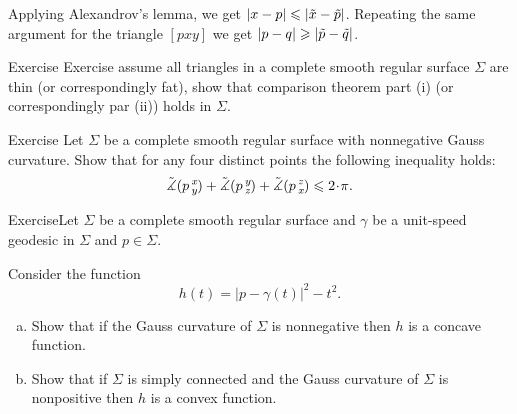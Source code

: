 Applying Alexandrov's lemma, we get $|x-p|\le |\~x-\~p|$.
Repeating the same argument for the triangle $[pxy]$ we get $|p-q|\ge |\~p-\~q|$.\qeds

\begin{thm}{Exercise}
Exercise assume all triangles in a complete smooth regular surface $\Sigma$ are thin (or correspondingly fat), show that comparison theorem part (i) (or correspondingly par (ii)) holds in $\Sigma$.
\end{thm}

\begin{thm}{Exercise}
Let $\Sigma$ be a complete smooth regular surface with nonnegative Gauss curvature.
Show that for any four distinct points the following inequality holds:
\[\angk pxy+\angk pyz+\angk pzx\le2\cdot \pi.\]

\end{thm}

\begin{thm}{Exercise}Let $\Sigma$ be a complete smooth regular surface
and $\gamma$ be a unit-speed geodesic in $\Sigma$ and $p\in\Sigma$.

Consider the function
\[h(t)=|p-\gamma(t)|^2-t^2.\]

\begin{enumerate}[(a)]
\item Show that if the Gauss curvature of $\Sigma$ is nonnegative then $h$ is a concave function.
\item Show that if $\Sigma$ is simply connected and the Gauss curvature of $\Sigma$ is nonpositive then $h$ is a convex function.
\end{enumerate}
\end{thm}








